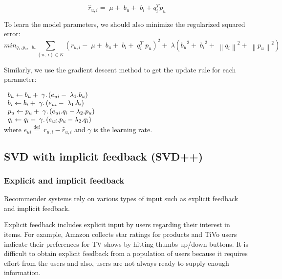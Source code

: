 \documentclass[oneside,13pt]{extreport}
\begin{document}
\begin{equation}
{\hat r_{u,i}} = \;\mu  + \;{b_u} + \;{b_i} + q_i^T{p_u}
\label{eq: SVD}
\end{equation}

To learn the model parameters, we should also minimize the regularized squared error:
\begin{equation}
mi{n_{{q_*},{p_*},\;\;{b_*}}}\mathop \sum \limits_{\left( {u,\;i} \right) \in K} {\left( {{r_{u,i}} - \;\mu  + \;{b_u} + \;{b_i} + \;q_i^T\;{p_u}} \right)^2} + \;\lambda \left( {{b_u}^2 + \;{b_i}^2 + \;{{\left\| {{q_i}} \right\|}^2} + \;{{\left\| {{p_u}} \right\|}^2}} \right)
\end{equation}

Similarly, we use the gradient descent method to get the update rule for each parameter:

$
\begin{array}{l}{b_u} \leftarrow {b_u} + {\rm{\;}}\gamma .\left( {{e_{ui}} - {\rm{\;}}{\lambda _1}.{b_u}} \right)\\{b_i} \leftarrow {b_i} + {\rm{\;}}\gamma .\left( {{e_{ui}} - {\rm{\;}}{\lambda _1}.{b_i}} \right)\\{p_u} \leftarrow {p_u} + {\rm{\;}}\gamma .\left( {{e_{ui}}.{q_i} - {\lambda _2}.{p_u}} \right)\\{q_i} \leftarrow {q_i} + {\rm{\;}}\gamma .\left( {{e_{ui}}.{p_u} - {\lambda _2}.{q_i}} \right)\end{array}
$
\\
where ${e_{ui}} \stackrel{\text{def}}{=} \;{r_{u,i}} - \hat r_{u,i}$ and $\gamma$ is the learning rate.

\subsection{SVD with implicit feedback (SVD++)}
\subsubsection{Explicit and implicit feedback}
Recommender systems rely on various types of input such as explicit feedback and implicit feedback. 

Explicit feedback includes explicit input by users regarding their interest in items. For example, Amazon collects star ratings for products and TiVo users indicate their
preferences for TV shows by hitting thumbs-up/down buttons. It is difficult to obtain explicit  feedback from a population of users because it requires effort from the users and also, users are not always ready to supply enough information. 
\end{document}
